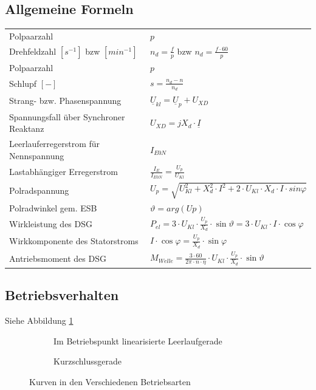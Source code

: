     \subsection{Allgemeine Formeln}
    \begin{tabular}[c]{ | p{7cm} | p{8cm} |}
    	\hline
    	Polpaarzahl	& $p$\\
    	Drehfeldzahl $[s^{-1}]$ bzw $[min^{-1}]$ & $n_d=\frac{f}{p}$ bzw
    	$n_d=\frac{f\cdot 60}{p}$\\
    	\hline
    	Polpaarzahl & $p$ \\
    	\hline
    	Schlupf $[-]$ & $s=\frac{n_d-n}{n_d}$\\
    	\hline
    	Strang- bzw. Phasenspannung &
    	$\underline{U}_{kl}=\underline{U}_p+U_{XD}$\\
    	\hline
    	Spannungsfall über Synchroner Reaktanz & $U_{XD}=jX_d\cdot\underline{I}$\\
    	\hline
    	Leerlauferregerstrom für Nennspannung & $I_{E0N}$\\
    	\hline
    	Lastabhängiger Erregerstrom & $\frac{I_E}{I_{E0N}}=\frac{U_p}{U_{Kl}}$\\
    	\hline
    	Polradspannung & $U_p=\sqrt{U_{Kl}^2+X_d^2\cdot I^2+2\cdot U_{Kl}\cdot
    	X_d \cdot I\cdot sin \varphi}$\\
    	\hline
    	Polradwinkel gem. ESB & $\vartheta = arg(Up)$\\
    	\hline
    	Wirkleistung des DSG & $P_{el}=3\cdot
    	U_{Kl}\cdot\frac{U_p}{X_d}\cdot \sin\vartheta = 3 \cdot U_{Kl} \cdot I \cdot \cos{\varphi}$\\
    	\hline
    	Wirkkomponente des Statorstroms & $I \cdot \cos{\varphi} = \frac{U_p}{X_d} \cdot \sin{\varphi}$ \\
    	\hline
    	Antriebsmoment des DSG & $M_{Welle}=\frac{3\cdot60}{2\pi\cdot n \cdot
    	\eta}\cdot U_{Kl}\cdot\frac{U_p}{X_d}\cdot\sin\vartheta$\\
    	\hline
    \end{tabular}

    \subsection{Betriebsverhalten}
    	Siehe Abbildung \ref{fig:betriebsverhalten}
    	\begin{figure}[h!]
	    	\centering
	    	\begin{subfigure}[t]{0.45\textwidth}
	    		\centering
	    		\caption{Im Betriebspunkt linearisierte Leerlaufgerade}
	    	\end{subfigure}
	    	\begin{subfigure}[t]{0.45\textwidth}
	    		\centering
	    		\caption{Kurzschlussgerade}
	        \end{subfigure}
	        \caption{Kurven in den Verschiedenen Betriebsarten}
	        \label{fig:betriebsverhalten}
    	\end{figure}
    	

